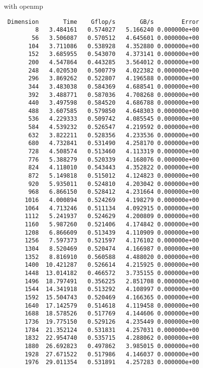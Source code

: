 \documentclass{article}
\begin{document}
with openmp
\begin{verbatim}
 Dimension       Time    Gflop/s       GB/s        Error
         8   3.484161   0.574027   5.166240 0.000000e+00
        56   3.506087   0.570512   4.645601 0.000000e+00
       104   3.711086   0.538928   4.352880 0.000000e+00
       152   3.685955   0.543070   4.373141 0.000000e+00
       200   4.547864   0.443285   3.564012 0.000000e+00
       248   4.020530   0.500779   4.022382 0.000000e+00
       296   3.869262   0.522807   4.196588 0.000000e+00
       344   3.483038   0.584369   4.688541 0.000000e+00
       392   3.488771   0.587036   4.708268 0.000000e+00
       440   3.497598   0.584520   4.686788 0.000000e+00
       488   3.607585   0.579850   4.648303 0.000000e+00
       536   4.229333   0.509742   4.085545 0.000000e+00
       584   4.539232   0.526547   4.219592 0.000000e+00
       632   3.822211   0.528356   4.233536 0.000000e+00
       680   4.732841   0.531490   4.258170 0.000000e+00
       728   4.508574   0.513460   4.113319 0.000000e+00
       776   5.388279   0.520339   4.168076 0.000000e+00
       824   4.118010   0.543443   4.352822 0.000000e+00
       872   5.149818   0.515012   4.124823 0.000000e+00
       920   5.935011   0.524810   4.203042 0.000000e+00
       968   6.866150   0.528412   4.231664 0.000000e+00
      1016   4.000894   0.524269   4.198279 0.000000e+00
      1064   4.713246   0.511134   4.092915 0.000000e+00
      1112   5.241937   0.524629   4.200809 0.000000e+00
      1160   5.987260   0.521406   4.174842 0.000000e+00
      1208   6.866609   0.513439   4.110909 0.000000e+00
      1256   7.597373   0.521597   4.176102 0.000000e+00
      1304   8.520469   0.520474   4.166987 0.000000e+00
      1352   8.816910   0.560588   4.488020 0.000000e+00
      1400  10.421287   0.526614   4.215925 0.000000e+00
      1448  13.014182   0.466572   3.735155 0.000000e+00
      1496  18.797491   0.356225   2.851708 0.000000e+00
      1544  14.341918   0.513292   4.108997 0.000000e+00
      1592  15.504743   0.520469   4.166365 0.000000e+00
      1640  17.142579   0.514618   4.119458 0.000000e+00
      1688  18.578526   0.517769   4.144606 0.000000e+00
      1736  19.775150   0.529126   4.235449 0.000000e+00
      1784  21.352124   0.531831   4.257031 0.000000e+00
      1832  22.954740   0.535715   4.288062 0.000000e+00
      1880  26.692823   0.497862   3.985015 0.000000e+00
      1928  27.671522   0.517986   4.146037 0.000000e+00
      1976  29.011354   0.531891   4.257283 0.000000e+00
\end{verbatim}
\end{document}
